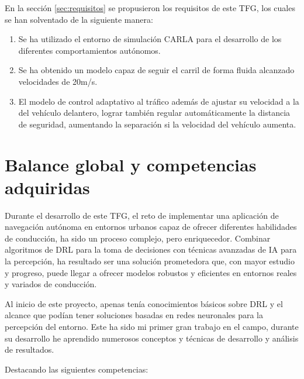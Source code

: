 En la sección \ref{sec:requisitos} se propusieron los requisitos de este \ac{TFG}, los cuales se han solventado de la siguiente manera:

\begin{enumerate}
\item Se ha utilizado el entorno de simulación CARLA para el desarrollo de los diferentes comportamientos autónomos.
\item Se ha obtenido un modelo capaz de seguir el carril de forma fluida alcanzado velocidades de 20m/s.
\item El modelo de control adaptativo al tráfico además de ajustar su velocidad a la del vehículo delantero, lograr también regular automáticamente la distancia de seguridad, aumentando la separación si la velocidad del vehículo aumenta.
\end{enumerate}

\section{Balance global y competencias adquiridas}

Durante el desarrollo de este \ac{TFG}, el reto de implementar una aplicación de navegación autónoma en entornos urbanos capaz de ofrecer diferentes habilidades de conducción, ha sido un proceso complejo, pero enriquecedor. Combinar algoritmos de \ac{DRL} para la toma de decisiones con técnicas avanzadas de \ac{IA} para la percepción, ha resultado ser una solución prometedora que, con mayor estudio y progreso, puede llegar a ofrecer modelos robustos y eficientes en entornos reales y variados de conducción.

Al inicio de este proyecto, apenas tenía conocimientos básicos sobre \ac{DRL} y el alcance que podían tener soluciones basadas en redes neuronales para la percepción del entorno. Este ha sido mi primer gran trabajo en el campo, durante su desarrollo he aprendido numerosos conceptos y técnicas de desarrollo y análisis de resultados.

Destacando las siguientes competencias:

